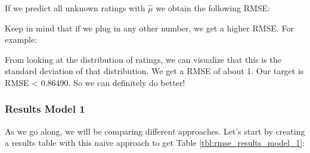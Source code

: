 \documentclass[
]{article}
\newenvironment{Shaded}{}{}
\newcommand{\DecValTok}[1]{\textcolor[rgb]{0.25,0.63,0.44}{#1}}
\newcommand{\FloatTok}[1]{\textcolor[rgb]{0.25,0.63,0.44}{#1}}
\newcommand{\FunctionTok}[1]{\textcolor[rgb]{0.02,0.16,0.49}{#1}}
\newcommand{\NormalTok}[1]{#1}
\newcommand{\OtherTok}[1]{\textcolor[rgb]{0.00,0.44,0.13}{#1}}
\newcommand{\SpecialCharTok}[1]{\textcolor[rgb]{0.25,0.44,0.63}{#1}}
\begin{document}
If we predict all unknown ratings with \(\hat\mu\) we obtain the
following RMSE:

\begin{Shaded}
\end{Shaded}

Keep in mind that if we plug in any other number, we get a higher RMSE.
For example:

\begin{Shaded}
\end{Shaded}

From looking at the distribution of ratings, we can visualize that this
is the standard deviation of that distribution. We get a RMSE of about
1. Our target is RMSE \textless{} 0.86490. So we can definitely do
better!

\newpage

\hypertarget{results-model-1}{%
\subsubsection{Results Model 1}\label{results-model-1}}

As we go along, we will be comparing different approaches. Let's start
by creating a results table with this naive approach to get Table
\ref{tbl:rmse_results_model_1}:
\end{document}
